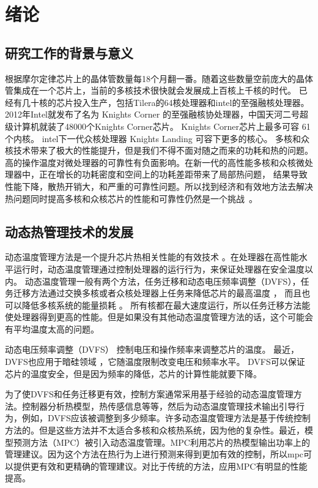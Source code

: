 
\chapter{绪论}
\section{研究工作的背景与意义}\label{sec:mean}
根据摩尔定律芯片上的晶体管数量每18个月翻一番。随着这些数量空前庞大的晶体管集成在一个芯片上，当前的多核技术很快就会发展成上百核上千核的时代\cite{borkar:DAC'07}。
已经有几十核的芯片投入生产，包括Tilera的64核处理器和intel的至强融核处理器。2012年Intel就发布了名为 Knights Corner 的至强融核协处理器，中国天河二号超级计算机就装了48000个Knights Corner芯片。
Knights Corner芯片上最多可容 61个内核。
intel下一代众核处理器 Knights Landing 可容下更多的核心。
多核和众核技术带来了极大的性能提升，但是我们不得不面对随之而来的功耗和热的问题。
高的操作温度对微处理器的可靠性有负面影响。在新一代的高性能多核和众核微处理器中，正在增长的功耗密度和空间上的功耗差距带来了局部热问题，
结果导致性能下降，散热开销大，和严重的可靠性问题。所以找到经济和有效地方法去解决热问题同时提高多核和众核芯片的性能和可靠性仍然是一个挑战~\cite{Brooks:MICRO'07}。

\section{动态热管理技术的发展}\label{sec:his}

动态温度管理方法是一个提升芯片热相关性能的有效技术 \cite{Donald:ISCA'06}。在处理器在高性能水平运行时，动态温度管理通过控制处理器的运行行为，来保证处理器在安全温度以内。
动态温度管理一般有两个方法，任务迁移和动态电压频率调整（DVFS），任务迁移方法通过交换多核或者众核处理器上任务来降低芯片的最高温度 \cite{Powell:ASPLOS'04,Ge:DAC'10,Chantem:TVLSI'11,Liu:DATE'12,Ayoub:ISLPED'09,Ebi:ICCAD'09} ，
而且也可以降低多核系统的能量损耗 \cite{Cong:ISLPED'12}。
所有核都在最大速度运行，所以任务迁移方法能使处理器得到更高的性能。但是如果没有其他动态温度管理方法的话，这个可能会有平均温度太高的问题。

 动态电压频率调整（DVFS）\cite{Skadron:ISCA'03,Jayaseelan:ICCAD'09,Mutapcic:TCASI'09} 控制电压和操作频率来调整芯片的温度。
 最近，DVFS也应用于暗硅领域 \cite{Khdr:dac'15,Muthukaruppan:dac'13}，它随温度限制改变电压和频率水平。
 DVFS可以保证芯片的温度安全，但是因为频率的降低，芯片的计算性能就要下降。
 
 为了使DVFS和任务迁移更有效，控制方案通常采用基于经验的动态温度管理方法。控制器分析热模型，热传感信息等等，然后为动态温度管理技术输出引导行为，例如，DVFS应该被调整到多少频率。许多动态温度管理方法是基于传统控制方法的。但是这些方法并不太适合多核和众核热系统，因为他的复杂性。最近，模型预测方法（MPC）被引入动态温度管理。MPC利用芯片的热模型输出功率上的管理建议。因为这个方法在热行为上进行预测来得到更加有效的控制，所以mpc可以提供更有效和更精确的管理建议。对比于传统的方法，应用MPC有明显的性能提高。
 
